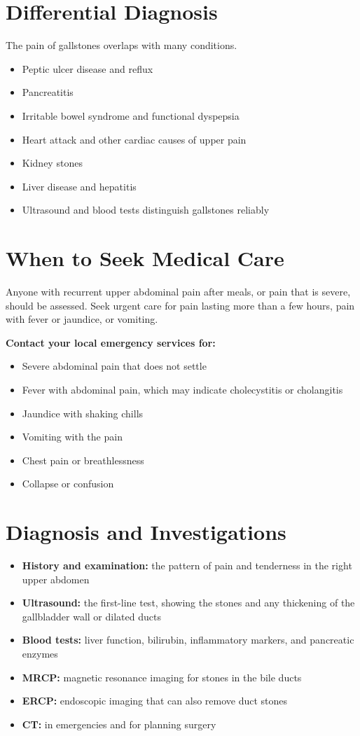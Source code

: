 \section*{Differential Diagnosis}
The pain of gallstones overlaps with many conditions.
\begin{itemize}
    \item Peptic ulcer disease and reflux
    \item Pancreatitis
    \item Irritable bowel syndrome and functional dyspepsia
    \item Heart attack and other cardiac causes of upper pain
    \item Kidney stones
    \item Liver disease and hepatitis
    \item Ultrasound and blood tests distinguish gallstones reliably
\end{itemize}

\section*{When to Seek Medical Care}
Anyone with recurrent upper abdominal pain after meals, or pain that is severe, should be assessed. Seek urgent care for pain lasting more than a few hours, pain with fever or jaundice, or vomiting.

\textbf{Contact your local emergency services for:}
\begin{itemize}
    \item Severe abdominal pain that does not settle
    \item Fever with abdominal pain, which may indicate cholecystitis or cholangitis
    \item Jaundice with shaking chills
    \item Vomiting with the pain
    \item Chest pain or breathlessness
    \item Collapse or confusion
\end{itemize}

\section*{Diagnosis and Investigations}
\begin{itemize}
    \item \textbf{History and examination:} the pattern of pain and tenderness in the right upper abdomen
    \item \textbf{Ultrasound:} the first-line test, showing the stones and any thickening of the gallbladder wall or dilated ducts
    \item \textbf{Blood tests:} liver function, bilirubin, inflammatory markers, and pancreatic enzymes
    \item \textbf{MRCP:} magnetic resonance imaging for stones in the bile ducts
    \item \textbf{ERCP:} endoscopic imaging that can also remove duct stones
    \item \textbf{CT:} in emergencies and for planning surgery
\end{itemize}

